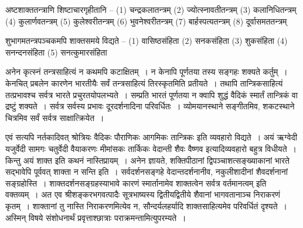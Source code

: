 {अष्टशाक्ततन्त्राणि शिष्टाचारगृहीतानि – (1) चन्द्रकलातन्त्रम् (2) ज्योत्स्नावतीतन्त्रम् (3) कलानिधितन्त्रम् (4) कुलार्णवतन्त्रम् (5) कुलेश्वरीतन्त्रम् (6) भुवनेश्वरीतन्त्रम् (7) बार्हस्पत्यतन्त्रम् (8) दूर्वासमततन्त्रम्

शुभागमतन्त्रपञ्चकमपि शाक्तसमये विद्यते – (1) वासिष्ठसंहिता (2) सनकसंहिता (3) शुकसंहिता (4) सनन्दनसंहिता (5) सनत्कुमारसंहिता

अनेन कृत्स्नं तन्त्रसाहित्यं न कथमपि कटाक्षितम्~। न केनापि पूर्णतया तस्य सङ्गहः शक्यते कर्तुम्~। केनचित् प्रबलेन कारणेन भारतीयैः सर्वं तन्त्रसाहित्यं तिरस्कृतमिति प्रतीयते~। तथापि तान्त्रिकसाहित्यं तत्प्रभावश्च सर्वत्र भारते प्रचुरतयोपलभ्यते~। सम्प्रति भारतं पूर्णतया न क्वापि शुद्धं वैदिकं स्मार्तं तान्त्रिकं वा द्रष्टुं शक्यते~। सर्वत्र सर्वस्य प्रभावः दूरदर्शनादिना परिवर्धितः~। व्योमयानस्थाने सङ्गीतमिव, शकटस्थाने चित्रमिव सर्वं सर्वत्र साक्षात्क्रियेत~। 

एवं सत्यपि नर्तकादिवत् श्रोत्रियः वैदिकः पौराणिकः आगमिकः तान्त्रिकः इति व्यवहारो विद्यते~। अयं ऋग्वेदी यजुर्वेदी सामगः चतुर्वेदी वैयाकरणः मीमांसकः तार्किकः वेदान्ती शैवः वैष्णव इत्यादिव्यवहारो बहुत्र विधीयते~। किन्तु अयं शाक्त इति कथनं नास्तिप्रायम्~। अनेन ज्ञायते, शक्तिपीठानां द्विपञ्चाशत्सङ्ख्याकानां भारते सद्भावेपि पूर्ववत् शाक्ता न सन्ति इति~। सर्वदर्शनसङ्गहे वेदान्तदर्शनानीव, नकुलीशादीनां शैवदर्शनानां सङ्ग्रहोस्ति~। शाक्तदर्शनसङ्ग्रहस्याभावे कारणं स्मार्तानामेव शाक्तत्वेन सर्वत्र वर्तमानत्वम् इति वक्तव्यम्~। अत एव श्रीशङ्करभगवत्पादैः सूत्रभाष्यस्य द्वितीयद्वितीये शैवानां भागवतानाञ्च निराकरणं कृतम्~। शाक्तानां तु नास्ति निराकरणमित्येव न, सौन्दर्यलहर्यादि शाक्तसाहित्यमेव परिवर्धितं दृश्यते~। अस्मिन् विषये  संशोधनार्थं प्रवृत्ताश्छात्राः पराक्रमन्तामित्युपरम्यते~। 

\articleend
}
